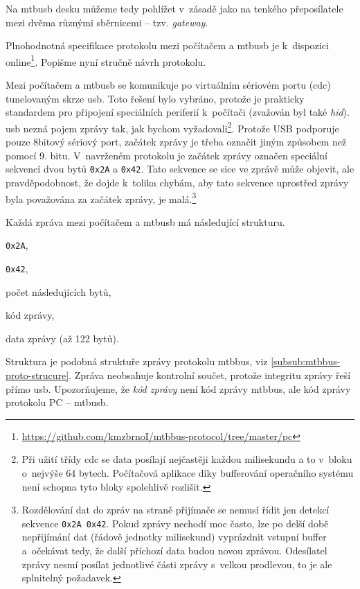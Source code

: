 Na \gls{mtbusb} desku můžeme tedy pohlížet v~zásadě jako na tenkého
přeposílatele mezi dvěma různými sběrnicemi – tzv. \textit{gateway}.

Plnohodnotná specifikace protokolu mezi počítačem a \gls{mtbusb} je
k~dispozici online\footnote{\url{https://github.com/kmzbrnoI/mtbbus-protocol/tree/master/pc}}.
Popišme nyní stručně návrh protokolu.

Mezi počítačem a \gls{mtbusb} se komunikuje po virtuálním sériovém portu
(\gls{cdc}) tunelovaným skrze \gls{usb}. Toto řešení
bylo vybráno, protože je prakticky standardem pro připojení speciálních
periferií k~počítači (zvažován byl také \textit{\gls{hid}}).
\gls{usb} nezná pojem zprávy tak, jak bychom
vyžadovali\footnote{Při užití třídy \gls{cdc} se data posílají nejčastěji
každou milisekundu a to v~bloku o~nejvýše 64 bytech.  Počítačová aplikace díky
bufferování operačního systému není schopna tyto bloky spolehlivě rozlišit.}.
Protože USB podporuje pouze 8bitový sériový port, začátek zprávy je třeba
označit jiným způsobem než pomocí 9. bitu. V~navrženém protokolu je začátek
zprávy označen speciální sekvencí dvou bytů \texttt{0x2A} a \texttt{0x42}. Tato sekvence
se sice ve zprávě může objevit, ale pravděpodobnost, že dojde k~tolika chybám,
aby tato sekvence uprostřed zprávy byla považována za začátek zprávy, je
malá.\footnote{Rozdělování dat do zpráv na straně přijímače se
nemusí řídit jen detekcí sekvence \texttt{0x2A 0x42}. Pokud zprávy nechodí moc
často, lze po delší době nepřijímání dat (řádově jednotky milisekund) vyprázdnit
vstupní buffer a~očekávat tedy, že další příchozí data budou novou zprávou.
Odesílatel zprávy nesmí posílat jednotlivé části zprávy s~velkou prodlevou, to
je ale splnitelný požadavek.}

Každá zpráva mezi počítačem a \gls{mtbusb} má následující strukturu.

\begin{compactenum}
\item \texttt{0x2A},
\item \texttt{0x42},
\item počet následujících bytů,
\item kód zprávy,
\item data zprávy (až 122 bytů).
\end{compactenum}

Struktura je podobná struktuře zprávy protokolu \gls{mtbbus}, viz
\ref{subsub:mtbbus-proto-strucure}. Zpráva neobsahuje kontrolní součet, protože
integritu zprávy řeší přímo \gls{usb}.
Upozorňujeme, že \textit{kód zprávy} není kód zprávy \gls{mtbbus},
ale kód zprávy protokolu PC – \gls{mtbusb}.

